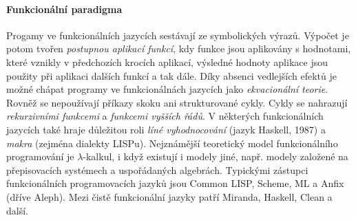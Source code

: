 \documentclass[10pt,a4paper]{article}
\begin{document}
    \paragraph{Funkcionální paradigma}
      Progamy ve funkcionálních jazycích sestávají ze symbolických výrazů. Výpočet je potom tvořen \textit{postupnou aplikací funkcí}, kdy funkce jsou aplikovány s hodnotami, které vznikly v předchozích krocích aplikací, výsledné hodnoty aplikace jsou použity při aplikaci dalších funkcí a tak dále. Díky absenci vedlejších efektů je možné chápat programy ve funkcionálnách jazycích jako \textit{ekvacionální teorie}. Rovněž se nepoužívají příkazy skoku ani strukturované cykly. Cykly se nahrazují \textit{rekurzivními funkcemi} a \textit{funkcemi vyšších řádů}. V některých funkcionálních jazycích také hraje důležitou roli \textit{líné vyhodnocování} (jazyk Haskell, 1987) a \textit{makra} (zejména dialekty LISPu). Nejznámější teoretický model funkcionálního programování je $\lambda$-kalkul, i když existují i modely jiné, např. modely založené na přepisovacích systémech a uspořádaných algebrách. Typickými zástupci funkcionálních programovacích jazyků jsou Common LISP, Scheme, ML a Anfix (dříve Aleph). Mezi čistě funkcionální jazyky patří Miranda, Haskell, Clean a další.
\end{document}
